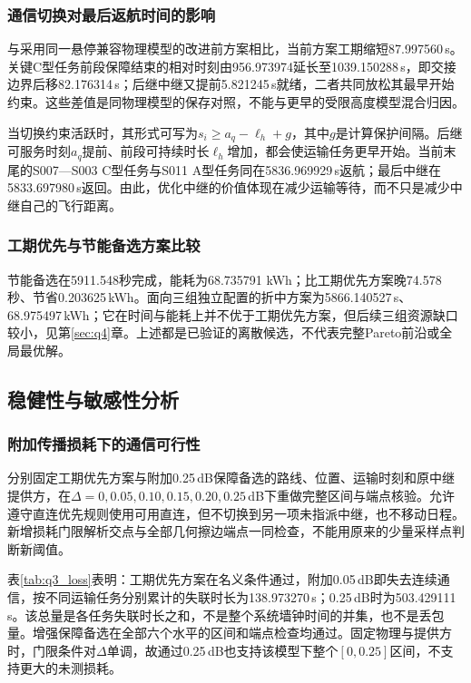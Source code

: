 \documentclass[withoutpreface,colorprint]{format}
\numberwithin{equation}{section}
\numberwithin{figure}{section}
\numberwithin{table}{section}
\begin{document}
\subsubsection{通信切换对最后返航时间的影响}
与采用同一悬停兼容物理模型的改进前方案相比，当前方案工期缩短87.997560\,s。关键C型任务前段保障结束的相对时刻由956.973974延长至1039.150288\,s，即交接边界后移82.176314\,s；后继中继又提前5.821245\,s就绪，二者共同放松其最早开始约束。这些差值是同物理模型的保存对照，不能与更早的受限高度模型混合归因。

当切换约束活跃时，其形式可写为$s_i\ge a_q-\ell_h+g$，其中$g$是计算保护间隔。后继可服务时刻$a_q$提前、前段可持续时长$\ell_h$增加，都会使运输任务更早开始。当前末尾的S007—S003 C型任务与S011 A型任务同在5836.969929\,s返航；最后中继在5833.697980\,s返回。由此，优化中继的价值体现在减少运输等待，而不只是减少中继自己的飞行距离。

\subsubsection{工期优先与节能备选方案比较}
节能备选在5911.548秒完成，能耗为68.735791 kWh；比工期优先方案晚74.578秒、节省0.203625\,kWh。面向三组独立配置的折中方案为5866.140527\,s、68.975497\,kWh；它在时间与能耗上并不优于工期优先方案，但后续三组资源缺口较小，见第\ref{sec:q4}章。上述都是已验证的离散候选，不代表完整Pareto前沿或全局最优解。

\subsection{稳健性与敏感性分析}
\label{sec:q3_robust}
\subsubsection{附加传播损耗下的通信可行性}
分别固定工期优先方案与附加0.25\,dB保障备选的路线、位置、运输时刻和原中继提供方，在$\Delta=0,0.05,0.10,0.15,0.20,0.25$\,dB下重做完整区间与端点核验。允许遵守直连优先规则使用可用直连，但不切换到另一项未指派中继，也不移动日程。新增损耗门限解析交点与全部几何擦边端点一同检查，不能用原来的少量采样点判断新阈值。

表\ref{tab:q3_loss}表明：工期优先方案在名义条件通过，附加0.05\,dB即失去连续通信，按不同运输任务分别累计的失联时长为138.973270\,s；0.25\,dB时为503.429111\,s。该总量是各任务失联时长之和，不是整个系统墙钟时间的并集，也不是丢包量。增强保障备选在全部六个水平的区间和端点检查均通过。固定物理与提供方时，门限条件对$\Delta$单调，故通过0.25\,dB也支持该模型下整个$[0,0.25]$区间，不支持更大的未测损耗。
\end{document}
